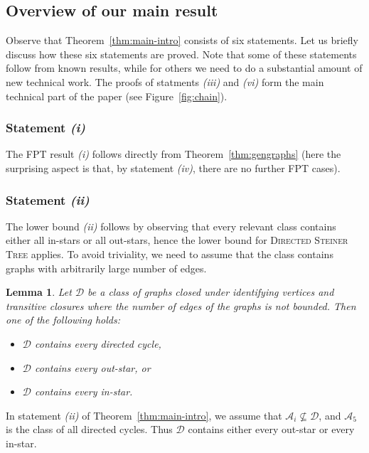 \documentclass[a4paper,11pt]{article}
\newcommand{\calD}{\mathcal{D}}
\theoremstyle{plain}
\newtheorem{lemma}[theorem]{Lemma}
\newtheorem{identification rule}{Identification Rule}
\theoremstyle{definition}
\theoremstyle{remark}
\newcommand{\oldC}{\mathcal{A}}
\begin{document}
 \subsection{Overview of our main result}

Observe that Theorem~\ref{thm:main-intro} consists of six statements. Let us briefly discuss how these six statements are proved. Note that some of these statements follow from known results, while for others we need to do a substantial amount of new technical work. The proofs of statments \textit{(iii)} and \textit{(vi)} form the main technical part of the paper (see Figure~\ref{fig:chain}).

\subsubsection*{Statement \textit{(i)}}
  
  The FPT result \textit{(i)} follows directly from Theorem~\ref{thm:gengraphs} (here the surprising aspect is that, by statement \textit{(iv)}, there are no further FPT cases).

\subsubsection*{Statement \textit{(ii)}}

  The lower bound \textit{(ii)} follows by observing that every relevant class contains either all in-stars or all out-stars, hence the lower bound for \textsc{Directed Steiner Tree} \cite{DBLP:conf/focs/MarxPP18} applies. To avoid triviality, we need to assume that the class contains graphs with arbitrarily large number of edges.
  \begin{lemma}\label{lem:findstar}
    Let $\calD$ be a class of graphs closed under identifying vertices and transitive closures where the number of edges of the graphs is not bounded. Then one of the following holds:
\begin{itemize}  \item $\calD$ contains every directed cycle,
  \item $\calD$ contains every out-star, or
  \item $\calD$ contains every in-star.
  \end{itemize}
\end{lemma}
In statement \textit{(ii)} of Theorem~\ref{thm:main-intro}, we assume that $\oldC_i\not\subseteq \calD$, and $\oldC_5$ is the class of all directed cycles. Thus $\calD$ contains either every out-star or every in-star.
\end{document}
